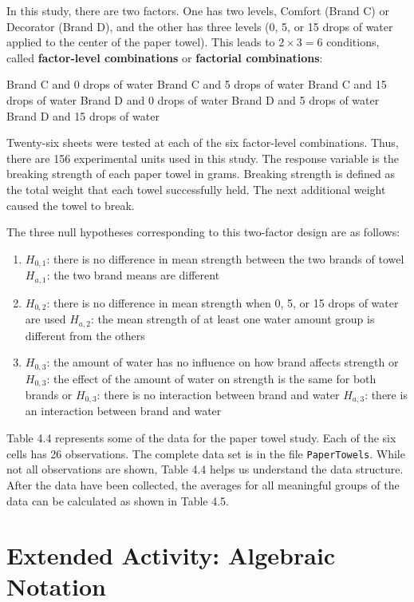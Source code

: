 \documentclass[
]{report}
\begin{document}
In this study, there are two factors. One has two levels, Comfort (Brand C) or Decorator (Brand D), and the other has three levels (0, 5, or 15 drops of water applied to the center of the paper towel). This leads to \(2 \times 3 = 6\) conditions, called \textbf{factor-level combinations} or \textbf{factorial combinations}:

Brand C and 0 drops of water
Brand C and 5 drops of water
Brand C and 15 drops of water
Brand D and 0 drops of water
Brand D and 5 drops of water
Brand D and 15 drops of water

Twenty-six sheets were tested at each of the six factor-level combinations. Thus, there are 156 experimental units used in this study. The response variable is the breaking strength of each paper towel in grams. Breaking strength is defined as the total weight that each towel successfully held. The next additional weight caused the towel to break.

The three null hypotheses corresponding to this two-factor design are as follows:

\begin{enumerate}
\def\labelenumi{\arabic{enumi}.}
\item
  \(H_{0,1}\): there is no difference in mean strength between the two brands of towel
  \(H_{a,1}\): the two brand means are different
\item
  \(H_{0,2}\): there is no difference in mean strength when 0, 5, or 15 drops of water are used
  \(H_{a,2}\): the mean strength of at least one water amount group is different from the others
\item
  \(H_{0,3}\): the amount of water has no influence on how brand affects strength
  or \(H_{0,3}\): the effect of the amount of water on strength is the same for both brands
  or \(H_{0,3}\): there is no interaction between brand and water
  \(H_{a,3}\): there is an interaction between brand and water
\end{enumerate}

Table 4.4 represents some of the data for the paper towel study. Each of the six cells has 26 observations. The complete data set is in the file \texttt{PaperTowels}. While not all observations are shown, Table 4.4 helps us understand the data structure. After the data have been collected, the averages for all meaningful groups of the data can be calculated as shown in Table 4.5.

\hypertarget{extended-activity-algebraic-notation}{%
\section*{Extended Activity: Algebraic Notation}\label{extended-activity-algebraic-notation}}
\end{document}
